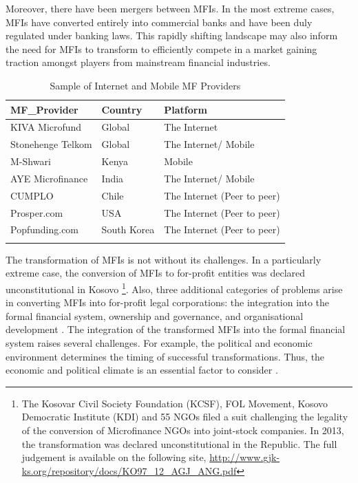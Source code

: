 \documentclass[a4paper, nobind]{templates/ociamthesis}
\begin{document}
Moreover, there have been mergers between MFIs. In the most extreme cases, MFIs have converted entirely into commercial banks and have been duly regulated under banking laws. This rapidly shifting landscape may also inform the need for MFIs to transform to efficiently compete in a market gaining traction amongst players from mainstream financial industries.

\begin{table}

\caption{\label{tab:unnamed-chunk-4}Sample of Internet and Mobile MF Providers}
\centering
\fontsize{9}{11}\selectfont
\begin{tabu} to 
\toprule
MF\_Provider & Country & Platform\\
\midrule
KIVA Microfund & Global & The Internet\\
Stonehenge Telkom & Global & The Internet/ Mobile\\
M-Shwari & Kenya & Mobile\\
AYE Microfinance & India & The Internet/ Mobile\\
CUMPLO & Chile & The Internet (Peer to peer)\\
\addlinespace
Prosper.com & USA & The Internet (Peer to peer)\\
Popfunding.com & South Korea & The Internet (Peer to peer)\\
\bottomrule
{}\\
\end{tabu}
\end{table}

The transformation of MFIs is not without its challenges. In a particularly extreme case, the conversion of MFIs to for-profit entities was declared unconstitutional in Kosovo \autocite{hasani2013ustav} \footnote{The Kosovar Civil Society Foundation (KCSF), FOL Movement, Kosovo Democratic Institute (KDI) and 55 NGOs filed a suit challenging the legality of the conversion of Microfinance NGOs into joint-stock companies. In 2013, the transformation was declared unconstitutional in the Republic. The full judgement is available on the following site, \url{http://www.gjk-ks.org/repository/docs/KO97_12_AGJ_ANG.pdf}}. Also, three additional categories of problems arise in converting MFIs into for-profit legal corporations: the integration into the formal financial system, ownership and governance, and organisational development \autocite{campion1999institutional}. The integration of the transformed MFIs into the formal financial system raises several challenges. For example, the political and economic environment determines the timing of successful transformations. Thus, the economic and political climate is an essential factor to consider \autocite{kenya2012transforming}.
\end{document}
